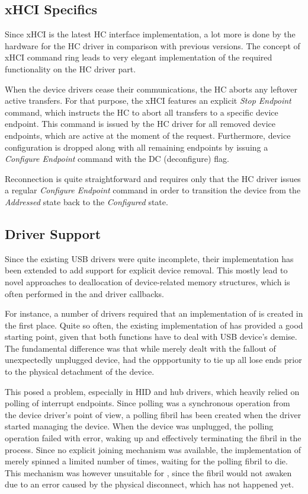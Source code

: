 \subsection{xHCI Specifics}

Since xHCI is the latest HC interface implementation, a lot more is done by the
hardware for the HC driver in comparison with previous versions. The concept of
xHCI command ring leads to very elegant implementation of the required
functionality on the HC driver part.

When the device drivers cease their communications, the HC aborts any leftover
active transfers. For that purpose, the xHCI features an explicit \textit{Stop
Endpoint} command, which instructs the HC to abort all transfers to a specific
device endpoint. This command is issued by the HC driver for all removed device
endpoints, which are active at the moment of the request. Furthermore, device
configuration is dropped along with all remaining endpoints by issuing a
\textit{Configure Endpoint} command with the DC (deconfigure) flag.

Reconnection is quite straightforward and requires only that the HC driver
issues a regular \textit{Configure Endpoint} command in order to transition the
device from the \textit{Addressed} state back to the \textit{Configured} state.


\subsection{Driver Support}

Since the existing USB drivers were quite incomplete, their implementation has
been extended to add support for explicit device removal. This mostly lead to
novel approaches to deallocation of device-related memory structures, which is
often performed in the  and  driver
callbacks.

For instance, a number of drivers required that an implementation of
 is created in the first place. Quite so often, the
existing implementation of  has provided a good starting
point, given that both functions have to deal with USB device's demise. The
fundamental difference was that while  merely dealt with
the fallout of unexpectedly unplugged device,  had the
oppportunity to tie up all lose ends prior to the physical detachment of the
device.

This posed a problem, especially in HID and hub drivers, which heavily relied on
polling of interrupt endpoints. Since polling was a synchronous operation from
the device driver's point of view, a polling fibril has been created when the
driver started managing the device. When the device was unplugged, the polling
operation failed with error, waking up and effectively terminating the fibril in
the process. Since no explicit joining mechanism was available, the
implementation of  merely spinned a limited number of times,
waiting for the polling fibril to die. This mechanism was however unsuitable for
, since the fibril would not awaken due to an error caused
by the physical disconnect, which has not happened yet.

